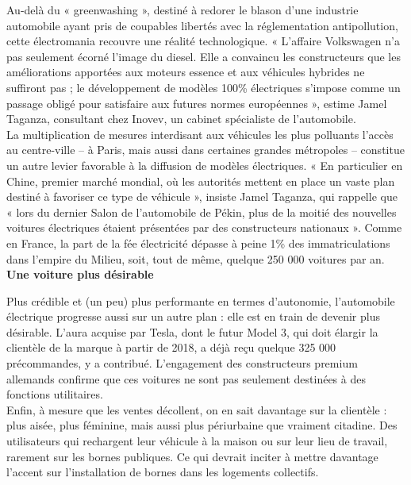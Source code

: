 \documentclass[8pt]{article}
\begin{document}
Au-delà du « greenwashing », destiné à redorer le blason d’une industrie automobile ayant pris de coupables libertés avec la réglementation antipollution, cette électromania recouvre une réalité technologique. « L’affaire Volkswagen n’a pas seulement écorné l’image du diesel. Elle a convaincu les constructeurs que les améliorations apportées aux moteurs essence et aux véhicules hybrides ne suffiront pas ; le développement de modèles 100\% électriques s’impose comme un passage obligé pour satisfaire aux futures normes européennes », estime Jamel Taganza, consultant chez Inovev, un cabinet spécialiste de l’automobile.  \\

La multiplication de mesures interdisant aux véhicules les plus polluants l’accès au centre-ville – à Paris, mais aussi dans certaines grandes métropoles – constitue un autre levier favorable à la diffusion de modèles électriques. « En particulier en Chine, premier marché mondial, où les autorités mettent en place un vaste plan destiné à favoriser ce type de véhicule », insiste Jamel Taganza, qui rappelle que « lors du dernier Salon de l’automobile de Pékin, plus de la moitié des nouvelles voitures électriques étaient présentées par des constructeurs nationaux ». Comme en France, la part de la fée électricité dépasse à peine 1\% des immatriculations dans l’empire du Milieu, soit, tout de même, quelque 250 000 voitures par an.  \\

\textbf{Une voiture plus désirable}

Plus crédible et (un peu) plus performante en termes d’autonomie, l’automobile électrique progresse aussi sur un autre plan : elle est en train de devenir plus désirable. L’aura acquise par Tesla, dont le futur Model 3, qui doit élargir la clientèle de la marque à partir de 2018, a déjà reçu quelque 325 000 précommandes, y a contribué. L’engagement des constructeurs premium allemands confirme que ces voitures ne sont pas seulement destinées à des fonctions utilitaires.  \\

Enfin, à mesure que les ventes décollent, on en sait davantage sur la clientèle : plus aisée, plus féminine, mais aussi plus périurbaine que vraiment citadine. Des utilisateurs qui rechargent leur véhicule à la maison ou sur leur lieu de travail, rarement sur les bornes publiques. Ce qui devrait inciter à mettre davantage l’accent sur l’installation de bornes dans les logements collectifs.
\end{document}
